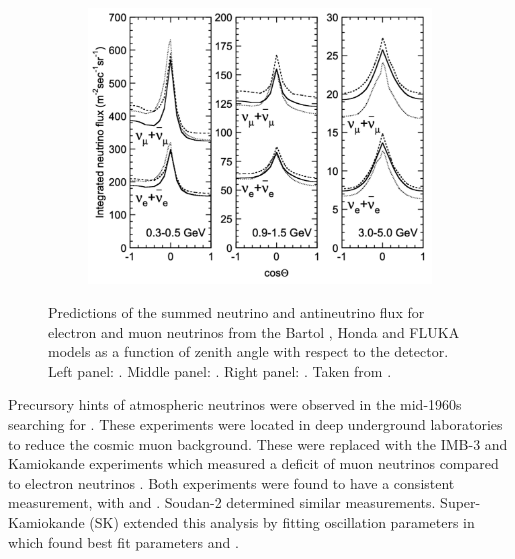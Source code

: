 \begin{figure}[h]
  \begin{subfigure}[t]{0.90\textwidth}
    \includegraphics[width=\textwidth, trim={0mm 0mm 0mm 0mm}, clip,page=1]{Figures/Theory/NuFluxZenithAngleDep.pdf}
  \end{subfigure}
  \caption{Predictions of the summed neutrino and antineutrino flux for electron and muon neutrinos from the Bartol \cite{Barr_2004}, Honda \cite{Honda_2007} and FLUKA \cite{etde_20239111} models as a function of zenith angle with respect to the detector. Left panel: . Middle panel: . Right panel: . Taken from \cite{Ashie_2005}.}
  \label{fig:NeutrinoOscillationPhysics_NuFluxZenithAngleDep}
\end{figure}

Precursory hints of atmospheric neutrinos were observed in the mid-1960s searching for  \cite{Reines1965-cf}. These experiments were located in deep underground laboratories to reduce the cosmic muon background. These were replaced with the IMB-3 \cite{PhysRevLett.66.2561} and Kamiokande \cite{Hirata1992-qz} experiments which measured a deficit of muon neutrinos compared to electron neutrinos . Both experiments were found to have a consistent measurement, with  and . Soudan-2 \cite{Allison1997-qz} determined similar measurements. Super-Kamiokande (SK) \cite{Ashie_2005} extended this analysis by fitting oscillation parameters in \quickmath{\nu_\mu \rightarrow \nu_\tau} which found best fit parameters  and .

